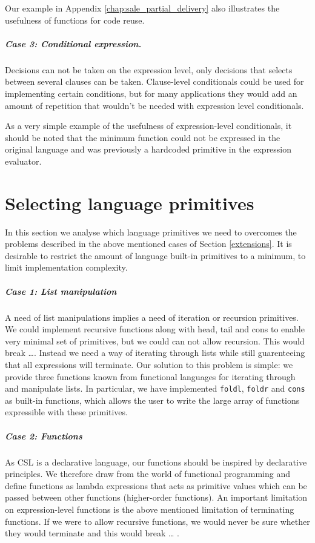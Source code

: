 \documentclass[10pt,a4paper,final,oneside,openany,article]{memoir}
\begin{document}
Our example in Appendix \ref{chap:sale_partial_delivery} also
illustrates the usefulness of functions for code reuse.

\paragraph{Case 3: Conditional expression.} Decisions can not be taken
on the expression level, only decisions that selects between several
clauses can be taken. Clause-level conditionals could be used for
implementing certain conditions, but for many applications they would
add an amount of repetition that wouldn't be needed with expression
level conditionals. 

As a very simple example of the usefulness of expression-level
conditionals, it should be noted that the minimum function could not
be expressed in the original language and was previously a hardcoded
primitive in the expression evaluator.

\chapter{Selecting language primitives}
In this section we analyse which language primitives we need to
overcomes the problems described in the above mentioned cases of
Section \ref{extensions}. It is desirable to restrict the amount of
language built-in primitives to a minimum, to limit implementation
complexity. 

\paragraph{Case 1: List manipulation}
A need of list manipulations implies a need of iteration or recursion
primitives. We could implement recursive functions along with head,
tail and cons to enable very minimal set of primitives, but we could
can not allow recursion. This would break \ldots {}.
Instead we need a way of iterating through lists while still
guarenteeing that all expressions will terminate.  Our solution to
this problem is simple: we provide three functions known from
functional languages for iterating through and manipulate lists. In
particular, we have implemented \lstinline{foldl}, \lstinline{foldr}
and \lstinline{cons} as built-in functions, which allows the user to
write the large array of functions expressible with these primitives.

\paragraph{Case 2: Functions} As CSL is a declarative language, our
functions should be inspired by declarative principles. We therefore
draw from the world of functional programming and define functions as
lambda expressions that acts as primitive values which can be passed
between other functions (higher-order functions). An important
limitation on expression-level functions is the above mentioned
limitation of terminating functions. If we were to allow recursive
functions, we would never be sure whether they would terminate and
this would break \ldots %
.
\end{document}

